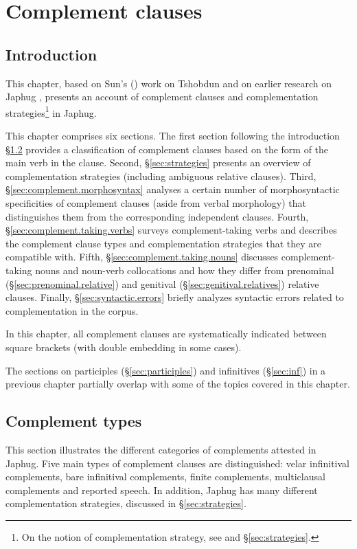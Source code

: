\chapter{Complement clauses} \label{chap:complement.clauses}

\section{Introduction} \label{sec:complement.intro}
This chapter, based on Sun's (\citeyear{sun12complementation}) work on Tshobdun and on earlier research on Japhug \citep{jacques08zh, jacques16complementation}, presents an account of complement clauses and complementation strategies\footnote{On the notion of complementation strategy, see \citep[34--40]{dixon06complementation} and §\ref{sec:strategies}. } in Japhug.
 
This chapter comprises six sections. The first section following the introduction §\ref{sec:complement.types} provides a classification of complement clauses based on the form of the main verb in the clause. Second, §\ref{sec:strategies} presents an overview of complementation strategies (including ambiguous relative clauses). Third, §\ref{sec:complement.morphosyntax} analyses a certain number of morphosyntactic specificities of complement clauses (aside from verbal morphology) that distinguishes them from the corresponding independent clauses. Fourth, §\ref{sec:complement.taking.verbs} surveys complement-taking verbs and describes the complement clause types and complementation strategies that they are compatible with. Fifth, §\ref{sec:complement.taking.nouns} discusses complement-taking nouns and noun-verb collocations and how they differ from prenominal (§\ref{sec:prenominal.relative}) and genitival (§\ref{sec:genitival.relatives}) relative clauses. Finally, §\ref{sec:syntactic.errors} briefly analyzes syntactic errors related to complementation in the corpus.

In this chapter, all complement clauses are systematically indicated between square brackets (with double embedding in some cases).
 
The sections on participles (§\ref{sec:participles}) and infinitives (§\ref{sec:inf}) in a previous chapter partially overlap with some of the topics covered in this chapter.
 
\section{Complement types} \label{sec:complement.types}
This section illustrates the different categories of complements attested in Japhug. Five main types of complement clauses are distinguished: velar infinitival complements, bare infinitival complements, finite complements, multiclausal complements and reported speech. In addition, Japhug has many different complementation strategies, discussed in §\ref{sec:strategies}.

